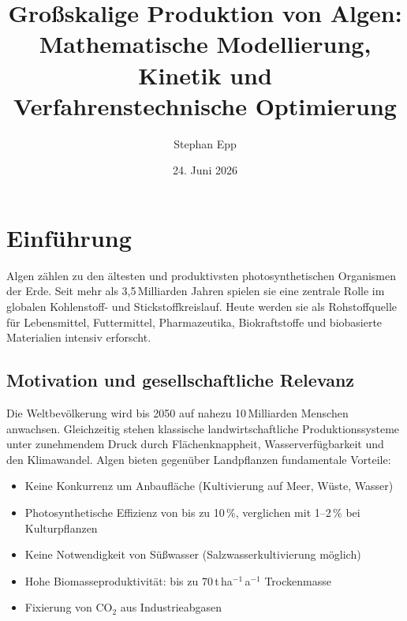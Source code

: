 ﻿\documentclass[a4paper,12pt]{article}
\title{Großskalige Produktion von Algen:\\
Mathematische Modellierung, Kinetik und\\
Verfahrenstechnische Optimierung}
\author{Stephan Epp}
\date{24. Juni 2026}
\theoremstyle{definition}
\begin{document}
\maketitle

\tableofcontents
\newpage

\section{Einführung}

Algen zählen zu den ältesten und produktivsten photosynthetischen Organismen der Erde.
Seit mehr als 3,5\,Milliarden Jahren spielen sie eine zentrale Rolle im globalen Kohlenstoff-
und Stickstoffkreislauf. Heute werden sie als Rohstoffquelle für Lebensmittel, Futtermittel,
Pharmazeutika, Biokraftstoffe und biobasierte Materialien intensiv erforscht.

\subsection{Motivation und gesellschaftliche Relevanz}

Die Weltbevölkerung wird bis 2050 auf nahezu 10\,Milliarden Menschen anwachsen.
Gleichzeitig stehen klassische landwirtschaftliche Produktionssysteme unter zunehmendem
Druck durch Flächenknappheit, Wasserverfügbarkeit und den Klimawandel. Algen bieten
gegenüber Landpflanzen fundamentale Vorteile:

\begin{itemize}
	\item Keine Konkurrenz um Anbaufläche (Kultivierung auf Meer, Wüste, Wasser)
	\item Photosynthetische Effizienz von bis zu 10\,\%, verglichen mit 1--2\,\% bei
	      Kulturpflanzen
	\item Keine Notwendigkeit von Süßwasser (Salzwasserkultivierung möglich)
	\item Hohe Biomasseproduktivität: bis zu 70\,t\,ha$^{-1}$\,a$^{-1}$ Trockenmasse
	\item Fixierung von \(\mathrm{CO}_2\) aus Industrieabgasen
\end{itemize}
\end{document}
